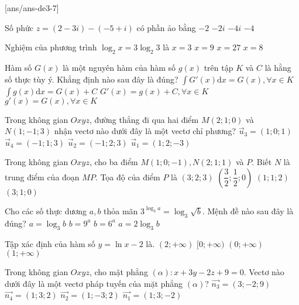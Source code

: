 
\begin{name}
	{\tenchude}
	{\tendethi}
	{\tentruong}
	{\thoigian}
\end{name}
[ans/ans-de3-7]

\begin{ex}%
Số phức $ z=(2-3 i)-(-5+i) $ có phần ảo bằng
\choice
{$-2$}
{$ -2 i $}
{$ -4 i $}
{\True $-4$}

\end{ex}
\begin{ex}%
Nghiệm của phương trình $\log_2 x=3\log_2 3$ là
\choice
{$x=3$}
{$x=9$}
{\True $x=27$}
{$x=8$}

\end{ex}
\begin{ex}%
Hàm số $G(x)$ là một nguyên hàm của hàm số $g(x)$ trên tập $K$ và $C$ là hằng số thực tùy ý. Khẳng định nào sau đây là đúng?
\choice
{$\displaystyle\int G'(x) \mathrm{d} x=G(x), \forall x \in K$}
{\True $\displaystyle\int g(x) \mathrm{d} x=G(x)+C$}
{$G'(x)=g(x)+C, \forall x \in K$}
{$g'(x)=G(x), \forall x \in K$}

\end{ex}
\begin{ex}%
Trong không gian $O x y z$, đường thẳng đi qua hai điểm $M(2; 1; 0)$ và $N(1;-1; 3)$ nhận vectơ nào dưới đây là một vectơ chỉ phương?
\choice
{$\vec{u}_3=(1; 0; 1)$}
{$\vec{u}_4=(-1; 1; 3)$}
{$\vec{u}_2=(-1; 2; 3)$}
{\True $\vec{u}_1=(1; 2;-3)$}

\end{ex}
\begin{ex}%
Trong không gian $O x y z$, cho ba điểm $M(1; 0;-1), N(2; 1; 1)$ và $P$. Biết $N$ là trung điểm của đoạn $MP$. Tọa độ của điểm $P$ là
\choice
{\True $(3; 2; 3)$}
{$\left(\dfrac{3}{2}; \dfrac{1}{2}; 0\right)$}
{$(1; 1; 2)$}
{$(3; 1; 0)$}

\end{ex}
\begin{ex}%
Cho các số thực dương $a, b$ thỏa mãn $3^{\log_3 a}=\log_3 \sqrt{b}$. Mệnh đề nào sau đây là đúng?
\choice
{$a=\log_3 b$}
{\True $b=9^{a}$}
{$b=6^{a}$}
{$a=2\log_3 b$}

\end{ex}
\begin{ex}%
Tập xác định của hàm số $y=\ln x-2$ là.
\choice
{$(2;+\infty)$}
{$[0;+\infty)$}
{\True $(0;+\infty)$}
{$(1;+\infty)$}

\end{ex}
\begin{ex}%
Trong không gian $O x y z$, cho mặt phẳng $(\alpha)\colon x+3 y-2 z+9=0$. Vectơ nào dưới đây là một vectơ pháp tuyến của mặt phẳng $(\alpha)$?
\choice
{$\overrightarrow{n_3}=(3;-2; 9)$}
{$\overrightarrow{n_4}=(1; 3; 2)$}
{$\overrightarrow{n_2}=(1;-3; 2)$}
{\True $\overrightarrow{n_1}=(1; 3;-2)$}

\end{ex}

